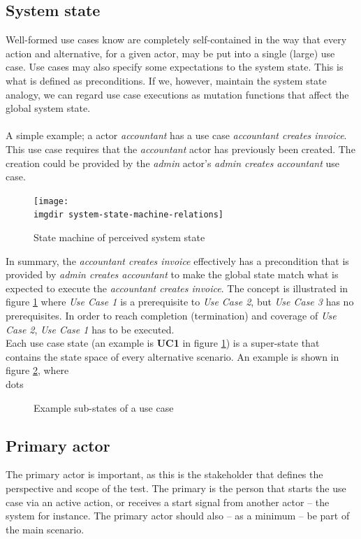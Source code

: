 \subsection{System state}
Well-formed use cases  know are completely self-contained\cite{larman2005} in the way that every action and alternative, for a given actor, may be put into a single (large) use case. Use cases may also specify some expectations to the system state. This is what is defined as preconditions. If we, however, maintain the system state analogy, we can regard use case executions as mutation functions that affect the global system state.\\\\
A simple example; a actor \emph{accountant} has a use case \emph{accountant creates invoice}. This use case requires that the \emph{accountant} actor has previously been created. The creation could be provided by the \emph{admin} actor's \emph{admin creates accountant} use case.
\begin{figure}[h]
\texttt{[image: \\imgdir system-state-machine-relations]}
\centering
\caption{State machine of perceived system state}
\label{fig:system-state-machine-relations}
\end{figure}
In summary, the \emph{accountant creates invoice} effectively has a precondition that is provided by \emph{admin creates accountant} to make the global state match what is expected to execute the \emph{accountant creates invoice}. The concept is illustrated in figure \ref{fig:system-state-machine-relations} where \emph{Use Case 1} is a prerequisite to \emph{Use Case 2}, but \emph{Use Case 3} has no prerequisites. In order to reach completion (termination) and coverage of \emph{Use Case 2}, \emph{Use Case 1} has to be executed.\\
Each use case state (an example is \textbf{UC1} in figure \ref{fig:system-state-machine-relations}) is a super-state that contains the state space of every alternative scenario. An example is shown in figure \ref{fig:system-sub-state-machine-relations}, where \\dots %
\begin{figure}[h]
\centering
\caption{Example sub-states of a use case}
\label{fig:system-sub-state-machine-relations}
\end{figure}

\subsection{Primary actor}
The primary actor is important, as this is the stakeholder that defines the perspective and scope of the test. The primary is the person that starts the use case via an active action, or receives a start signal from another actor -- the system for instance. The primary actor should also -- as a minimum -- be part of the main scenario.

